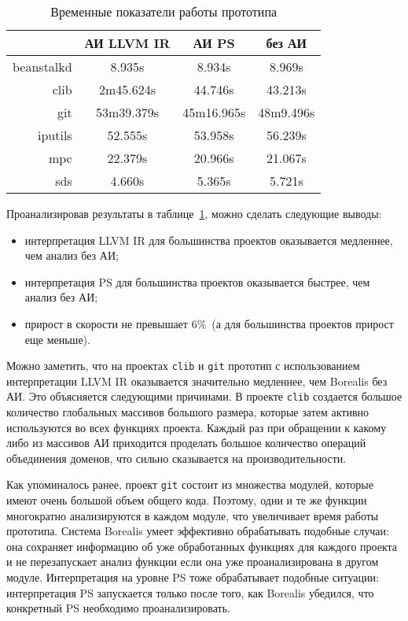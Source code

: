 \begin{table}
\caption{Временные показатели работы прототипа}
\centering
\begin{tabular}{|r|c|c|c|}
\hline
           & АИ LLVM IR   & АИ PS        & без АИ    \\ \hline
beanstalkd & 8.935s       & 8.934s       & 8.969s    \\ \hline
clib       & 2m45.624s    & 44.746s      & 43.213s   \\ \hline
git        & 53m39.379s   & 45m16.965s   & 48m9.496s \\ \hline
iputils    & 52.555s      & 53.958s      & 56.239s   \\ \hline
mpc        & 22.379s      & 20.966s      & 21.067s   \\ \hline
sds        & 4.660s       & 5.365s       & 5.721s    \\ \hline
\end{tabular}
\label{table:timeResults}
\end{table}

Проанализировав результаты в таблице~\ref{table:timeResults}, можно сделать 
следующие выводы:
\begin{itemize}
\item интерпретация LLVM IR для большинства проектов оказывается медленнее, чем
анализ без АИ;
\item интерпретация PS для большинства проектов оказывается быстрее, чем анализ
без АИ;
\item прирост в скорости не превышает $6\%$~(а для большинства проектов прирост
еще меньше).
\end{itemize}

Можно заметить, что на проектах \texttt{clib} и \texttt{git} прототип с 
использованием интерпретации LLVM IR оказывается значительно медленнее, чем
Borealis без АИ. Это объясняется следующими причинами. В проекте \texttt{clib}
создается большое количество глобальных массивов большого размера, которые
затем активно используются во всех функциях проекта. Каждый раз при обращении
к какому либо из массивов АИ приходится проделать большое количество операций
объединения доменов, что сильно сказывается на производительности.

Как упоминалось ранее, проект \texttt{git} состоит из множества модулей, 
которые имеют очень большой объем общего кода. Поэтому, одни и те же функции
многократно анализируются в каждом модуле, что увеличивает время работы 
прототипа. Система Borealis умеет эффективно обрабатывать подобные случаи: она
сохраняет информацию об уже обработанных функциях для каждого проекта и не 
перезапускает анализ функции если она уже проанализирована в другом модуле. 
Интерпретация на уровне PS тоже обрабатывает подобные ситуации: интерпретация 
PS запускается только после того, как Borealis убедился, что конкретный PS 
необходимо проанализировать.

